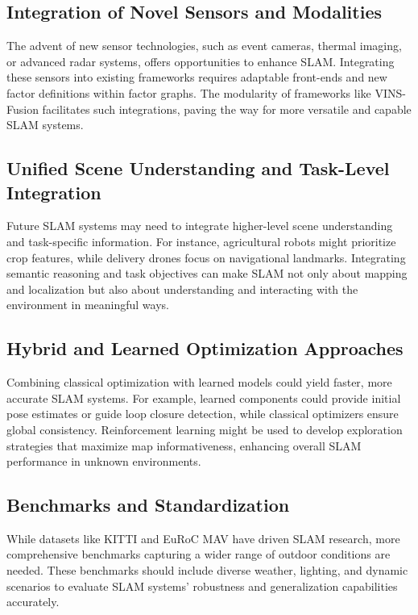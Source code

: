 \documentclass[conference]{IEEEtran}
\begin{document}
\subsection{Integration of Novel Sensors and Modalities}
The advent of new sensor technologies, such as event cameras, thermal imaging, or advanced radar systems, offers opportunities to enhance SLAM. Integrating these sensors into existing frameworks requires adaptable front-ends and new factor definitions within factor graphs. The modularity of frameworks like VINS-Fusion facilitates such integrations, paving the way for more versatile and capable SLAM systems.

\subsection{Unified Scene Understanding and Task-Level Integration}
Future SLAM systems may need to integrate higher-level scene understanding and task-specific information. For instance, agricultural robots might prioritize crop features, while delivery drones focus on navigational landmarks. Integrating semantic reasoning and task objectives can make SLAM not only about mapping and localization but also about understanding and interacting with the environment in meaningful ways.

\subsection{Hybrid and Learned Optimization Approaches}
Combining classical optimization with learned models could yield faster, more accurate SLAM systems. For example, learned components could provide initial pose estimates or guide loop closure detection, while classical optimizers ensure global consistency. Reinforcement learning might be used to develop exploration strategies that maximize map informativeness, enhancing overall SLAM performance in unknown environments.

\subsection{Benchmarks and Standardization}
While datasets like KITTI \cite{12} and EuRoC MAV \cite{13} have driven SLAM research, more comprehensive benchmarks capturing a wider range of outdoor conditions are needed. These benchmarks should include diverse weather, lighting, and dynamic scenarios to evaluate SLAM systems’ robustness and generalization capabilities accurately.
\end{document}
